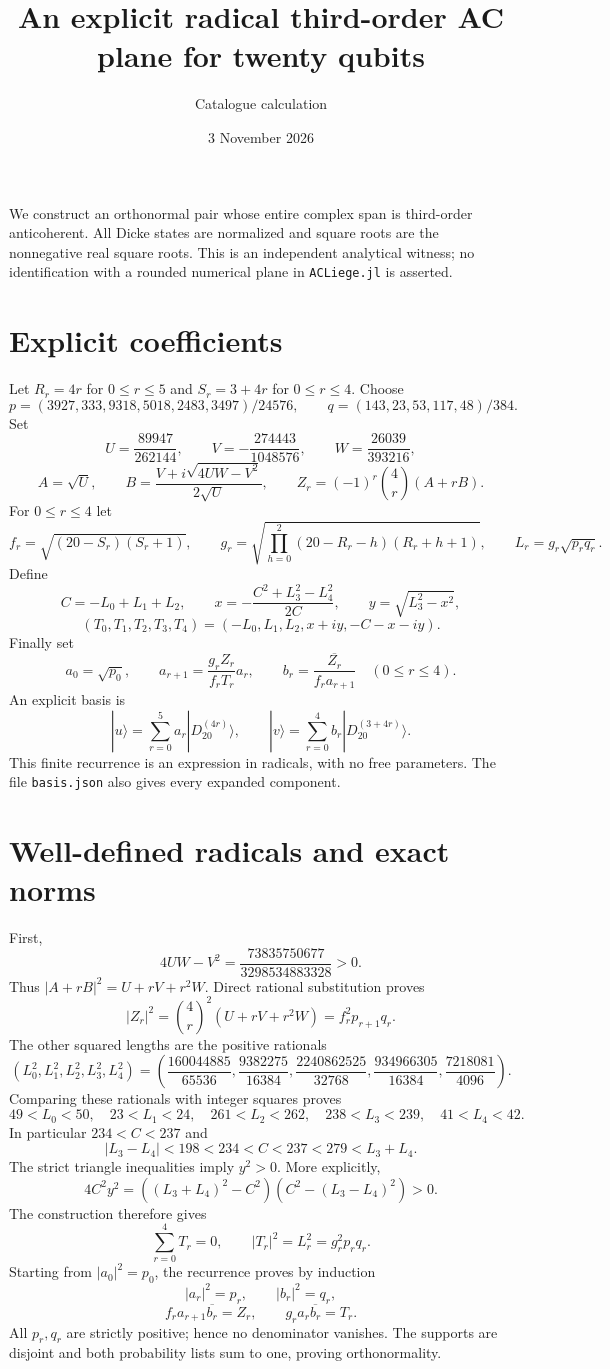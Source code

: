\documentclass[11pt]{article}
\newcommand{\D}[1]{|D_{20}^{(#1)}\rangle}
\begin{document}
\title{An explicit radical third-order AC plane for twenty qubits}
\author{Catalogue calculation}\date{3 November 2026}\maketitle
We construct an orthonormal pair whose entire complex span is third-order
anticoherent. All Dicke states are normalized and square roots are the
nonnegative real square roots. This is an independent analytical witness;
no identification with a rounded numerical plane in \texttt{ACLiege.jl} is
asserted.

\section{Explicit coefficients}
Let $R_r=4r$ for $0\leq r\leq5$ and $S_r=3+4r$ for $0\leq r\leq4$.
Choose
\[
 p=(3927,333,9318,5018,2483,3497)/24576,\qquad
 q=(143,23,53,117,48)/384.
\]
Set
\[
 U=\frac{89947}{262144},\qquad
 V=-\frac{274443}{1048576},\qquad W=\frac{26039}{393216},
\]
\[
 A=\sqrt U,\qquad B=\frac{V+i\sqrt{4UW-V^2}}{2\sqrt U},
 \qquad Z_r=(-1)^r\binom4r(A+rB).
\]
For $0\leq r\leq4$ let
\[
 f_r=\sqrt{(20-S_r)(S_r+1)},\qquad
 g_r=\sqrt{\prod_{h=0}^{2}(20-R_r-h)(R_r+h+1)},\qquad
 L_r=g_r\sqrt{p_rq_r}.
\]
Define
\[
 C=-L_0+L_1+L_2,\qquad
 x=-\frac{C^2+L_3^2-L_4^2}{2C},\qquad y=\sqrt{L_3^2-x^2},
\]
\[
 (T_0,T_1,T_2,T_3,T_4)=(-L_0,L_1,L_2,x+iy,-C-x-iy).
\]
Finally set
\[
 a_0=\sqrt{p_0},\qquad
 a_{r+1}=\frac{g_rZ_r}{f_rT_r}a_r,\qquad
 b_r=\overline{\frac{Z_r}{f_ra_{r+1}}}\quad(0\leq r\leq4).
\]
An explicit basis is
\[
 |u\rangle=\sum_{r=0}^{5}a_r\D{4r},\qquad
 |v\rangle=\sum_{r=0}^{4}b_r\D{3+4r}.
\]
This finite recurrence is an expression in radicals, with no free parameters.
The file \texttt{basis.json} also gives every expanded component.

\section{Well-defined radicals and exact norms}
First,
\[
 4UW-V^2=\frac{73835750677}{3298534883328}>0.
\]
Thus $|A+rB|^2=U+rV+r^2W$. Direct rational substitution proves
\[
 |Z_r|^2=\binom4r^2(U+rV+r^2W)=f_r^2p_{r+1}q_r.
\]
The other squared lengths are the positive rationals
\[
 (L_0^2,L_1^2,L_2^2,L_3^2,L_4^2)=
 \left(\frac{160044885}{65536},\frac{9382275}{16384},
 \frac{2240862525}{32768},\frac{934966305}{16384},
 \frac{7218081}{4096}\right).
\]
Comparing these rationals with integer squares proves
\[
 49<L_0<50,\quad23<L_1<24,\quad261<L_2<262,
 \quad238<L_3<239,\quad41<L_4<42.
\]
In particular $234<C<237$ and
\[
 |L_3-L_4|<198<234<C<237<279<L_3+L_4.
\]
The strict triangle inequalities imply $y^2>0$. More explicitly,
\[
 4C^2y^2=((L_3+L_4)^2-C^2)(C^2-(L_3-L_4)^2)>0.
\]
The construction therefore gives
\[
 \sum_{r=0}^{4}T_r=0,\qquad |T_r|^2=L_r^2=g_r^2p_rq_r.
\]
Starting from $|a_0|^2=p_0$, the recurrence proves by induction
\[
 |a_r|^2=p_r,\qquad |b_r|^2=q_r,
\]
\[
 f_ra_{r+1}\overline{b_r}=Z_r,\qquad
 g_ra_r\overline{b_r}=T_r.
\]
All $p_r,q_r$ are strictly positive; hence no denominator vanishes.
The supports are disjoint and both probability lists sum to one, proving
orthonormality.
\end{document}
